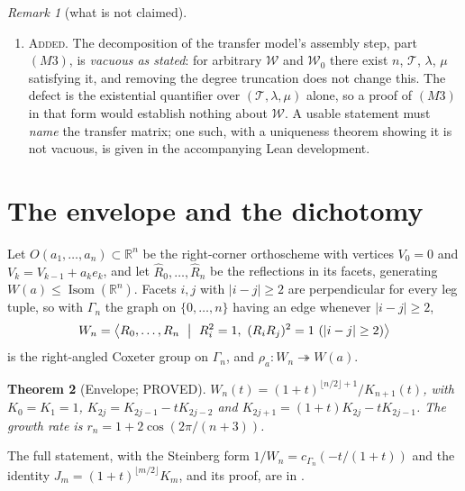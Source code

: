 \documentclass[11pt]{article}
\newtheorem{theorem}{Theorem}[section]
\theoremstyle{definition}
\theoremstyle{remark}
\newtheorem{remark}[theorem]{Remark}
\theoremstyle{definition}
\newcommand{\R}{\mathbb{R}}
\newcommand{\Isom}{\operatorname{Isom}}
\begin{document}
\begin{remark}[what is not claimed]
\begin{enumerate}[label=(\roman*),leftmargin=2.2em]
identity holds with no violation on every element enumerated to depth $29$, the potential
$\ell_R+2c$ is $1$-Lipschitz along the generators, and -- per the item above -- the lower bound
built from these corrected closed forms is now proved rather than open.
\item \textsc{Added.} The decomposition of the transfer model's assembly step, part $(M3)$,
is \emph{vacuous as stated}: for arbitrary $\mathcal W$ and $\mathcal W_0$ there exist
$n$, $\mathcal T$, $\lambda$, $\mu$ satisfying it, and removing the degree truncation does not
change this. The defect is the existential quantifier over $(\mathcal T,\lambda,\mu)$ alone, so a
proof of $(M3)$ in that form would establish nothing about $\mathcal W$. A usable statement must
\emph{name} the transfer matrix; one such, with a uniqueness theorem showing it is not vacuous, is
given in the accompanying Lean development.
\end{enumerate}
\end{remark}

\section{The envelope and the dichotomy}\label{sec:env}

Let $O(a_1,\dots,a_n)\subset\R^n$ be the right-corner orthoscheme with vertices $V_0=0$ and
$V_k=V_{k-1}+a_ke_k$, and let $\widehat R_0,\dots,\widehat R_n$ be the reflections in its facets,
generating $W(a)\le\Isom(\R^n)$. Facets $i,j$ with $|i-j|\ge2$ are perpendicular for every leg
tuple, so with $\Gamma_n$ the graph on $\{0,\dots,n\}$ having an edge whenever $|i-j|\ge2$,
\begin{equation}\label{eq:Wn}
W_n=\bigl\langle R_0,\dots,R_n\ \bigm|\ R_i^2=1,\ (R_iR_j)^2=1\ (|i-j|\ge2)\bigr\rangle
\end{equation}
is the right-angled Coxeter group on $\Gamma_n$, and $\rho_a\colon W_n\twoheadrightarrow W(a)$.

\begin{theorem}[Envelope; PROVED]\label{thm:envelope}
$W_n(t)=(1+t)^{\lfloor n/2\rfloor+1}/K_{n+1}(t)$, with $K_0=K_1=1$,
$K_{2j}=K_{2j-1}-tK_{2j-2}$ and $K_{2j+1}=(1+t)K_{2j}-tK_{2j-1}$. The growth rate is
$r_n=1+2\cos(2\pi/(n+3))$.
\end{theorem}

\noindent The full statement, with the Steinberg form $1/W_n=c_{\Gamma_n}(-t/(1+t))$ and the identity $J_m=(1+t)^{\lfloor m/2\rfloor}K_m$, and its proof, are in \cite{orthoscheme}.
\end{document}
